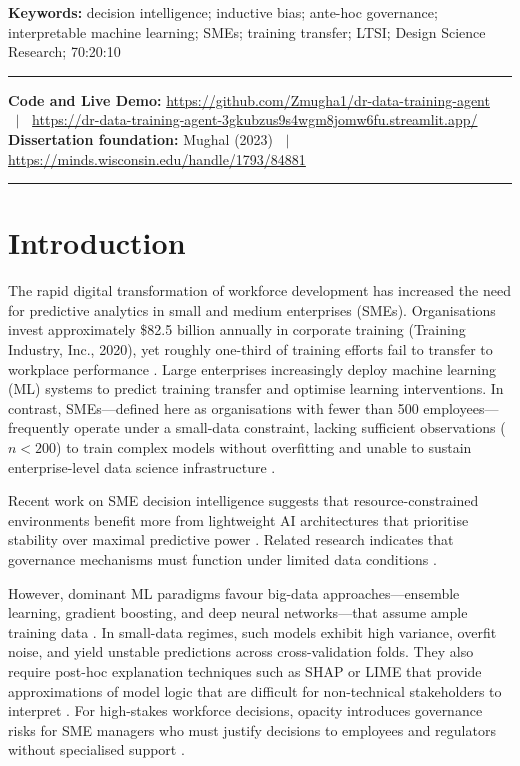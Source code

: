 \documentclass[11pt,a4paper]{article}
\begin{document}
\noindent\textbf{Keywords:} decision intelligence; inductive bias; ante-hoc governance; interpretable machine learning; SMEs; training transfer; LTSI; Design Science Research; 70:20:10

\vspace{4pt}\noindent\rule{\linewidth}{0.5pt}
\noindent\textbf{Code and Live Demo:}
\url{https://github.com/Zmugha1/dr-data-training-agent} $\;\mid\;$
\url{https://dr-data-training-agent-3gkubzus9s4wgm8jomw6fu.streamlit.app/}\\
\noindent\textbf{Dissertation foundation:} Mughal (2023) $\;\mid\;$
\url{https://minds.wisconsin.edu/handle/1793/84881}
\noindent\rule{\linewidth}{0.5pt}

\tableofcontents
\newpage

\section{Introduction}

The rapid digital transformation of workforce development has increased the need for predictive analytics in small and medium enterprises (SMEs). Organisations invest approximately \$82.5 billion annually in corporate training (Training Industry, Inc., 2020), yet roughly one-third of training efforts fail to transfer to workplace performance \citep{baldwin1988, chiaburu2010}. Large enterprises increasingly deploy machine learning (ML) systems to predict training transfer and optimise learning interventions. In contrast, SMEs---defined here as organisations with fewer than 500 employees---frequently operate under a small-data constraint, lacking sufficient observations ($n < 200$) to train complex models without overfitting and unable to sustain enterprise-level data science infrastructure \citep{oecd2021}.

Recent work on SME decision intelligence suggests that resource-constrained environments benefit more from lightweight AI architectures that prioritise stability over maximal predictive power \citep{deloitte2026, wu2025}. Related research indicates that governance mechanisms must function under limited data conditions \citep{aizenberh2024}.

However, dominant ML paradigms favour big-data approaches---ensemble learning, gradient boosting, and deep neural networks---that assume ample training data \citep{hardt2021}. In small-data regimes, such models exhibit high variance, overfit noise, and yield unstable predictions across cross-validation folds. They also require post-hoc explanation techniques such as SHAP or LIME that provide approximations of model logic that are difficult for non-technical stakeholders to interpret \citep{rudin2019}. For high-stakes workforce decisions, opacity introduces governance risks for SME managers who must justify decisions to employees and regulators without specialised support \citep{cigi2023}.
\end{document}
